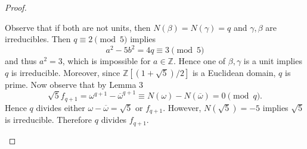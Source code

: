 \documentclass[10pt]{amsart}
\begin{document}
\begin{thm}
\begin{proof}
\begin{enumerate}[(a)]
			Observe that if both are not units, then $N(\beta) = N(\gamma) = q$ and $\gamma, \beta$ are irreducibles.  
			Then $q \equiv 2 \pmod{5}$ implies $$a^2 - 5b^2 = 4q \equiv 3 \pmod{5}$$ and thus $a^2 = 3$, which is impossible for $a \in \mathbb{Z}$.
			Hence one of $\beta, \gamma$ is a unit implies $q$ is irreducible.
			Moreover, since $\mathbb{Z}[(1 + \sqrt{5})/2]$ is a Euclidean domain, $q$ is prime.
			Now observe that by Lemma 3 
			$$\sqrt{5}f_{q+1} = \omega^{q+1} - \overline{\omega}^{q+1} \equiv N(\omega) - N(\overline{\omega}) = 0 \pmod{q}.$$
			Hence $q$ divides either $\omega - \overline{\omega} = \sqrt{5}$ or $f_{q+1}$.
			However, $N(\sqrt{5}) = -5$ implies $\sqrt{5}$ is irreducible.
			Therefore $q$ divides $f_{q+1}$.
	\end{enumerate}
	\end{proof}
\end{thm}
\end{document}
